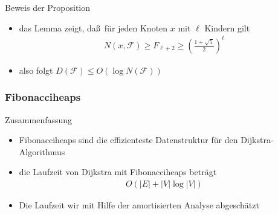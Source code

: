 \documentclass[aspectratio=1610, 11pt]{beamer}
\newcommand\cF{\mathcal F}
\newcommand\bc[1]{\left({#1}\right)}
\newcommand\bcfr[2]{\bc{\frac{#1}{#2}}}
\newcommand{\mytitle}{Fibonacciheaps}
\begin{document}
\begin{frame}
\begin{overprint}
\begin{exampleblock}{Beweis der Proposition}
			\begin{itemize}
				\item das Lemma zeigt, da\ss\ f\"ur jeden Knoten $x$ mit $\ell$ Kindern gilt
					\begin{align*}
						N(x,\cF)\geq F_{\ell+2}\geq\bcfr{1+\sqrt 5}2^\ell
					\end{align*}
				\item also folgt $D(\cF)\leq O(\log N(\cF))$
			\end{itemize}
		\end{exampleblock}
	\end{overprint}
\end{frame}

\begin{frame}\frametitle{\mytitle}
	\begin{overprint}
		\begin{exampleblock}{Zusammenfassung}
			\begin{itemize}
				\item Fibonacciheaps sind die effizienteste Datenstruktur f\"ur den Dijkstra-Algorithmus
				\item die Laufzeit von Dijkstra mit Fibonacciheaps betr\"agt
					\begin{align*}
						O(|E|+|V|\log|V|)
					\end{align*}
				\item Die Laufzeit wir mit Hilfe der \alert{amortisierten Analyse} abgesch\"atzt
			\end{itemize}
		\end{exampleblock}
	\end{overprint}
\end{frame}
\end{document}
